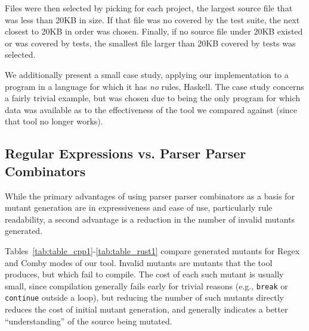 \documentclass[sigconf,review, anonymous]{acmart}
\begin{document}
{      Files were then selected by picking for each project, the
      largest source file that was less than 20KB in size.  If that
      file was no covered by the test suite, the next closest to 20KB in order
      was chosen.  Finally, if no source file under 20KB existed or
      was covered by tests, the smallest file larger than 20KB covered
      by tests was selected.


We additionally present a small
case study, applying our implementation to a program in a language for
which it has \emph{no} rules, Haskell.  The case study concerns a
fairly trivial example, but was chosen due to being the only program
for which data was available as to the effectiveness of the tool we
compared against (since that tool no longer works).

\subsection{Regular Expressions vs. Parser Parser Combinators}

While the primary advantages of using parser parser combinators as a
basis for mutant generation are in expressiveness and ease of use,
particularly rule readability, a second advantage is a reduction in
the number of invalid mutants generated.

Tables~\ref{tab:table_cpp1}-\ref{tab:table_rust1} compare generated
mutants for Regex and Comby modes of our tool.  Invalid
mutants are mutants that the tool produces, but which fail to
compile.  The cost of each such mutant is usually small,
since compilation generally fails early for trivial reasons (e.g.,
{\tt break} or {\tt continue} outside a loop), 
but reducing the number of such mutants directly reduces the cost of
initial mutant generation, and generally indicates a better
``understanding'' of the source being mutated.

}
\end{document}
